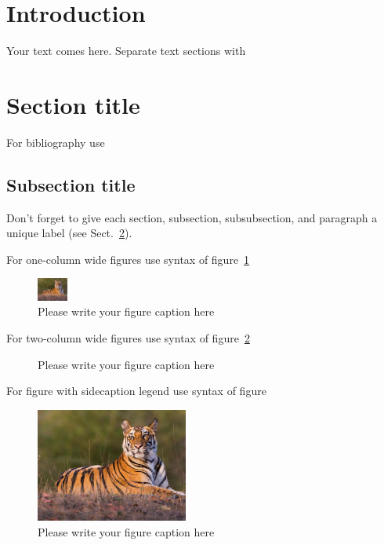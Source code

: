 \documentclass{webofc}
\begin{document}
\section{Introduction}
\label{intro}
Your text comes here. Separate text sections with
\section{Section title}
\label{sec-1}
For bibliography use \cite{RefJ}
\subsection{Subsection title}
\label{sec-2}
Don't forget to give each section, subsection, subsubsection, and
paragraph a unique label (see Sect.~\ref{sec-1}).

For one-column wide figures use syntax of figure~\ref{fig-1}
\begin{figure}[h]
\centering
\includegraphics[width=1cm,clip]{tiger}
\caption{Please write your figure caption here}
\label{fig-1}       %
\end{figure}

For two-column wide figures use syntax of figure~\ref{fig-2}
\begin{figure}
\centering
\vspace*{5cm}       %
\caption{Please write your figure caption here}
\label{fig-2}       %
\end{figure}

For figure with sidecaption legend use syntax of figure
\begin{figure}
\centering
\sidecaption
\includegraphics[width=5cm,clip]{tiger}
\caption{Please write your figure caption here}
\label{fig-3}       %
\end{figure}
\end{document}
